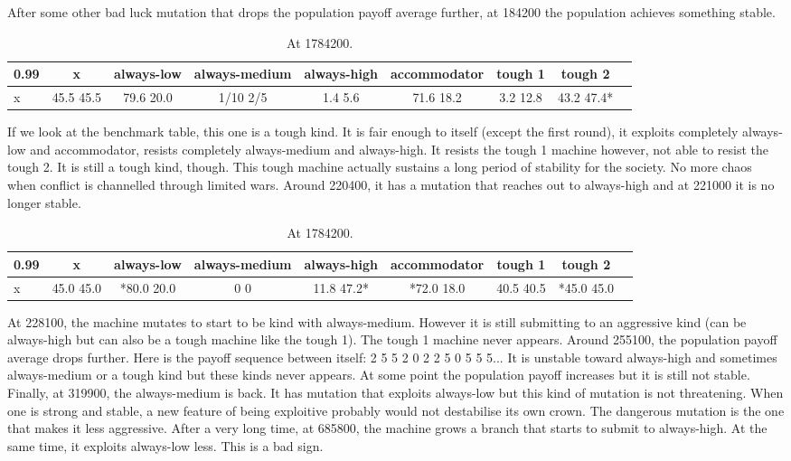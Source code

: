 \documentclass[12.5pt]{report}
\begin{document}
After some other bad luck mutation that drops the population payoff average further, at 184200 the population achieves something stable.
\begin{table}[h!]
\center
\begin{tabular}{l|cccccccc}
\textbf{0.99}& x & always-low & always-medium & always-high & accommodator &tough 1 & tough 2\\
\hline
x&45.5 45.5  &    79.6 20.0   &   1/10 2/5   &     1.4 5.6   &    71.6 18.2  &    3.2 12.8   &   43.2 47.4*\\
\end{tabular}
\caption{At 1784200.}
\end{table}
If we look at the benchmark table, this one is a tough kind. It is fair enough to itself (except the first round), it exploits completely always-low and accommodator, resists completely always-medium and always-high. It resists the tough 1 machine however, not able to resist the tough 2. It is still a tough kind, though. This tough machine actually sustains a long period of stability for the society. No more chaos when conflict is channelled through limited wars. Around 220400, it has a mutation that reaches out to always-high and at 221000 it is no longer stable.\\

\begin{table}[h!]
\center
\begin{tabular}{l|cccccccc}
\textbf{0.99}& x & always-low & always-medium & always-high & accommodator &tough 1 & tough 2\\
\hline
x&45.0 45.0  &   *80.0 20.0 &        0 0    &     11.8 47.2*  &  *72.0 18.0    &  40.5 40.5  &   *45.0 45.0\\
\end{tabular}
\caption{At 1784200.}
\end{table}
At 228100, the machine mutates to start to be kind with always-medium. However it is still submitting to an aggressive kind (can be always-high but can also be a tough machine like the tough 1). The tough 1 machine never appears. Around 255100, the population payoff average drops further. Here is the payoff sequence between itself: 2 5 5 2 0 2 2 5 0 5 5 5... It is unstable toward always-high and sometimes always-medium or a tough kind but these kinds never appears. At some point the population payoff increases but it is still not stable.\\

Finally, at 319900, the always-medium is back. It has mutation that exploits always-low but this kind of mutation is not threatening. When one is strong and stable, a new feature of being exploitive probably would not destabilise its own crown. The dangerous mutation is the one that makes it less aggressive. After a very long time, at 685800, the machine grows a branch that starts to submit to always-high. At the same time, it exploits always-low less. This is a bad sign.\\
\end{document}
